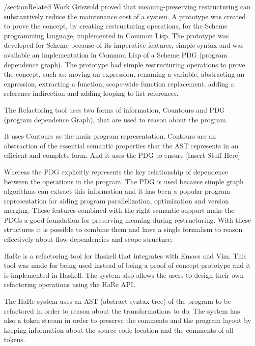/section{Related Work}
Griswold \cite{griswold1991program} proved that meaning-preserving restructuring
can substantively reduce the maintenance cost of a system. %
A prototype was created to prove the concept, by creating restructuring operations,
 for the Scheme programming language, implemented in Common Lisp.
The prototype was developed for Scheme because of its imperative features, simple %
syntax and was available an implementation in Common Lisp of a Scheme PDG (program dependence graph).
The prototype had simple restructuring operations to prove the concept, such as:
 moving an expression, renaming a variable, abstracting an expression, extracting a function, scope-wide function replacement, adding a reference indirection and adding looping to list references.

The Refactoring tool uses two forms of information, Countours and PDG (program dependence Graph),
that are used to reason about the program.

It uses Contours as the main program representation.
Contours are an abstraction of the essential semantic properties that the AST
represents in an efficient and complete form.
And it uses the PDG to ensure [Insert Stuff Here]

Whereas the PDG explicitly represents the key relationship of dependence between
the operations in the program. %
The PDG is used because simple graph algorithms can extract this information and
it has been a popular program representation for aiding program parallelization,
optimization and version merging.
These features combined with the right semantic support make the PDGs a good
foundation for preserving meaning during restructuring.
With these structures it is possible to combine them and have a single formalism
to reason effectively about flow dependencies and scope structure.




HaRe \cite{thompson2005refactoring} is a refactoring tool for Haskell that integrates with Emacs and Vim.
This tool was made for being used instead of being a proof of concept prototype
and it is implemented in Haskell.
The system also allows the users to design their own refactoring operations
using the HaRe API.

The HaRe system uses an AST (abstract syntax tree) of the program to be
refactored in order to reason about the transformations to do.
The system has also a token stream in order to preserve the comments and the
program layout by keeping information about the source code location and the comments of all tokens.

